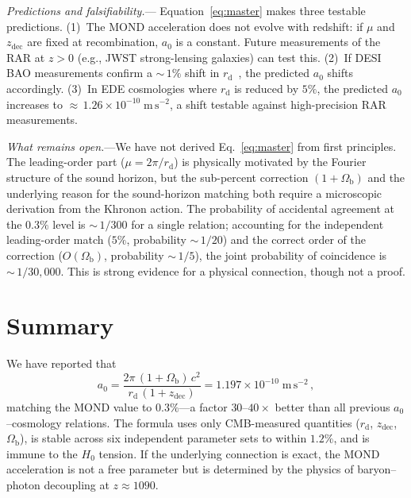 \documentclass[prl,twocolumn,superscriptaddress,longbibliography]{revtex4-2}
\newcommand{\zdec}{z_{\mathrm{dec}}}
\newcommand{\rd}{r_{\mathrm{d}}}
\newcommand{\Ob}{\Omega_{\mathrm{b}}}
\newcommand{\azero}{a_0}
\newcommand{\ms}{\mathrm{m\,s}^{-2}}
\begin{document}
\emph{Predictions and falsifiability.}---%
Equation~\eqref{eq:master} makes three testable
predictions.
(1)~The MOND acceleration does not evolve with
redshift: if $\mu$ and $\zdec$ are fixed at
recombination, $\azero$ is a constant.
Future measurements of the RAR at $z > 0$ (e.g.,
JWST strong-lensing galaxies) can test this.
(2)~If DESI BAO measurements confirm a ${\sim}\,1\%$
shift in $\rd$~\cite{DESI2024}, the predicted $\azero$
shifts accordingly.
(3)~In EDE cosmologies where $\rd$ is reduced by
$5\%$, the predicted $\azero$ increases to
${\approx}\,1.26 \times 10^{-10}\;\ms$,
a shift testable against high-precision RAR
measurements.

\emph{What remains open.}---We have not derived
Eq.~\eqref{eq:master} from first principles.
The leading-order part ($\mu = 2\pi/\rd$) is
physically motivated by the Fourier structure of
the sound horizon, but the sub-percent correction
$(1+\Ob)$ and the underlying reason for the
sound-horizon matching both require a microscopic
derivation from the Khronon action.
The probability of accidental agreement at the $0.3\%$
level is ${\sim}\,1/300$ for a single relation;
accounting for the independent leading-order match
($5\%$, probability ${\sim}\,1/20$) and the correct
order of the correction ($O(\Ob)$, probability
${\sim}\,1/5$), the joint probability of coincidence
is ${\sim}\,1/30{,}000$.
This is strong evidence for a physical connection,
though not a proof.


\section{Summary}
\label{sec:summary}

We have reported that
\begin{equation}
  \azero
  = \frac{2\pi\,(1+\Ob)\,c^2}{\rd\,(1+\zdec)}
  = 1.197 \times 10^{-10}\;\ms \,,
  \label{eq:summary}
\end{equation}
matching the MOND value to $0.3\%$---a factor
$30$--$40\times$ better than all previous
$\azero$--cosmology relations.
The formula uses only CMB-measured quantities
($\rd$, $\zdec$, $\Ob$), is stable across six
independent parameter sets to within $1.2\%$,
and is immune to the $H_0$ tension.
If the underlying connection is exact, the MOND
acceleration is not a free parameter but is
determined by the physics of baryon--photon
decoupling at $z \approx 1090$.
\end{document}
